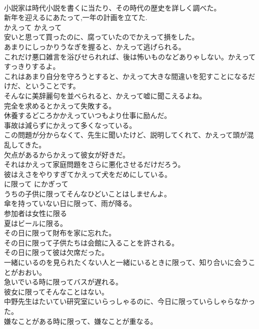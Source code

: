 \documentclass[8pt]{extreport}
\begin{document}
\begin{CJK}{UTF8}{min}
\\	小説家は時代小説を書くに当たり、その時代の歴史を詳しく調べた。  
\\	新年を迎えるにあたって,一年の計画を立てた.  
\\	かえって	かえって	
\\	安いと思って買ったのに、腐っていたのでかえって損をした。  
\\	あまりにしっかりうなぎを握ると、かえって逃げられる。  
\\	これだけ悪口雑言を浴びせられれば、後は怖いものなどありゃしない。かえってすっきりするよ。  
\\	これはあまり自分を守ろうとすると、かえって大きな間違いを犯すことになるだけだ、ということです。  
\\	そんなに美辞麗句を並べられると、かえって嘘に聞こえるよね。  
\\	完全を求めるとかえって失敗する。  
\\	休養するどころかかえっていつもより仕事に励んだ。  
\\	事故は減らずにかえって多くなっている。  
\\	この問題が分からなくて、先生に聞いたけど、説明してくれて、かえって頭が混乱してきた。  
\\	欠点があるからかえって彼女が好きだ。  
\\	それはかえって家庭問題をさらに悪化させるだけだろう。  
\\	彼はえさをやりすぎてかえって犬をだめにしている。   
\\	に限って	にかぎって	
\\	うちの子供に限ってそんなひどいことはしませんよ。  
\\	傘を持っていない日に限って、雨が降る。  
\\	参加者は女性に限る  
\\	夏はビールに限る。  
\\	その日に限って財布を家に忘れた。   
\\	その日に限って子供たちは会館に入ることを許される。   
\\	その日に限って彼は欠席だった。   
\\	一緒にいるのを見られたくない人と一緒にいるときに限って、知り合いに会うことがおおい。   
\\	急いでいる時に限ってバスが遅れる。   
\\	彼女に限ってそんなことはない。  
\\	中野先生はたいてい研究室にいらっしゃるのに、今日に限っていらしゃらなかった。   
\\	嫌なことがある時に限って、嫌なことが重なる。  

\end{CJK}
\end{document}
